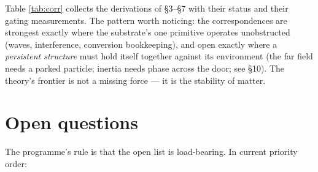 Table \ref{tab:corr} collects the derivations of §3--§7 with their
status and their gating measurements. The pattern worth noticing: the
correspondences are strongest exactly where the substrate's one
primitive operates unobstructed (waves, interference, conversion
bookkeeping), and open exactly where a \emph{persistent structure} must
hold itself together against its environment (the far field needs a
parked particle; inertia needs phase across the door; see §10). The
theory's frontier is not a missing force --- it is the stability of
matter.

\section{Open questions}\label{open-questions}

The programme's rule is that the open list is load-bearing. In current
priority order:

